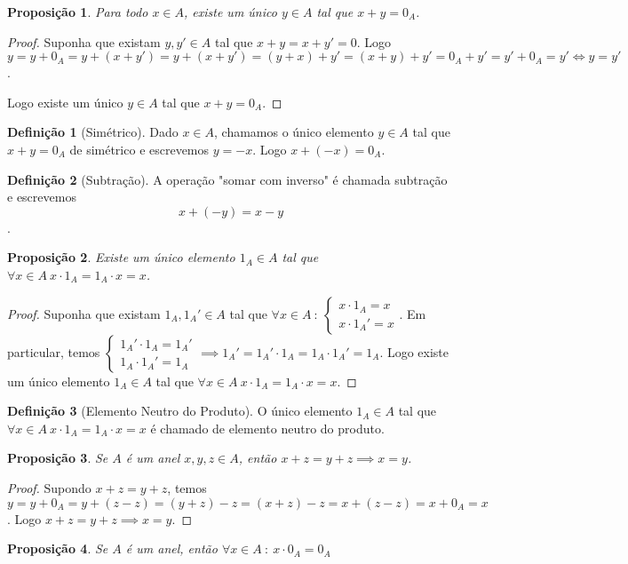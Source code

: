 \documentclass{article}
\theoremstyle{plain}
\newtheorem{prop}{Proposição}[section]
\theoremstyle{definition}
\newtheorem{definicao}{Definição}[section]
\theoremstyle{remark}
\begin{document}
\begin{prop}
	Para todo $x\in A$, existe um único $y \in A$ tal que $x+y = 0_A$.
\end{prop}
\begin{proof}
	Suponha que existam $y,y' \in A$ tal que $x + y = x+y' = 0$. Logo $y = y+0_A = y+(x+y') = y+(x+y') = (y+x) +y' = (x+y)+y' = 0_A +y' = y'+0_A = y' \iff y = y'$.

	Logo existe um único $y\in A$ tal que $x+y = 0_A$.
\end{proof}
\begin{definicao}[Simétrico]
	Dado $x\in A$, chamamos o único elemento $y\in A$ tal que $x+y = 0_A$ de simétrico e escrevemos $y = -x$. Logo $x+(-x) = 0_A$.
\end{definicao}
\begin{definicao}[Subtração]
	A operação "somar com inverso" é chamada subtração e escrevemos $$x+(-y) = x-y$$.
\end{definicao}
\begin{prop}
	Existe um único elemento $1_A\in A$ tal que $\forall x\in A \: x\cdot 1_A = 1_A\cdot x = x$.
\end{prop}
\begin{proof}
	Suponha que existam $1_A,1_A'\in A$ tal que $\forall x\in A \: : \:  \begin{cases} x\cdot 1_A = x \\ x\cdot1_A' = x\end{cases}$. Em particular, temos  $\begin{cases} 1_A'\cdot 1_A = 1_A' \\ 1_A\cdot1_A' = 1_A\end{cases} \implies 1_A' = 1_A'\cdot 1_A = 1_A\cdot 1_A' = 1_A$.
		Logo existe um único elemento $1_A\in A$ tal que $\forall x\in A \: x\cdot 1_A = 1_A\cdot x  = x$.
\end{proof}
\begin{definicao}[Elemento Neutro do Produto]
	O único elemento $1_A\in A$ tal que $\forall x\in A \: x\cdot 1_A = 1_A\cdot x = x$ é chamado de elemento neutro do produto.
\end{definicao}
\begin{prop}
	Se $A$ é um anel  $x,y,z\in A$, então  $ x+z = y+z \implies x  =y $.
\end{prop}
\begin{proof}
		Supondo $x+z = y+z$,  temos  $ y = y +0_A = y + (z-z) = (y+z) -z = (x+z) - z = x+(z-z) = x+0_A = x$. Logo $ x+z = y+z \implies x  =y $.
\end{proof}
\begin{prop}
	Se $A$ é um anel, então $\forall x \in A \: : \: x\cdot 0_A = 0_A$
\end{prop}
\end{document}
